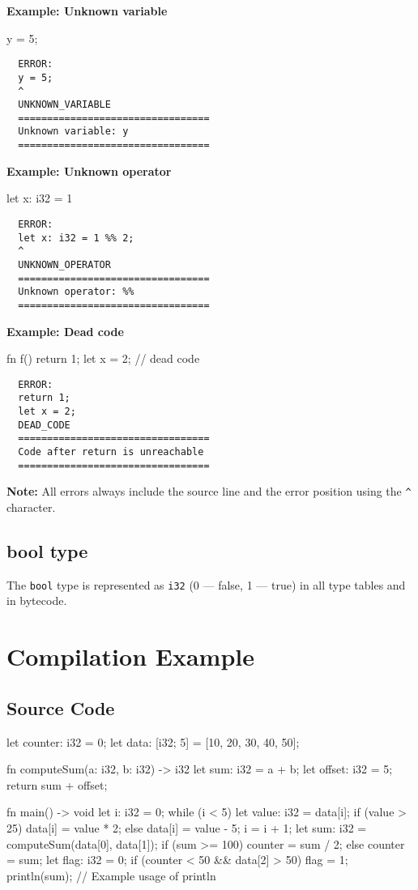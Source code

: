 \documentclass[a4paper,12pt]{article}
\begin{document}
    \textbf{Example: Unknown variable}
    \begin{snailcode}
        y = 5;
    \end{snailcode}
    \begin{verbatim}
  ERROR:
  y = 5;
  ^
  UNKNOWN_VARIABLE
  =================================
  Unknown variable: y
  =================================
    \end{verbatim}

    \textbf{Example: Unknown operator}
    \begin{snailcode}
        let x: i32 = 1 %
    \end{snailcode}
    \begin{verbatim}
  ERROR:
  let x: i32 = 1 %% 2;
  ^
  UNKNOWN_OPERATOR
  =================================
  Unknown operator: %%
  =================================
    \end{verbatim}

    \textbf{Example: Dead code}
    \begin{snailcode}
        fn f() {
  return 1;
  let x = 2; // dead code
  }
    \end{snailcode}
    \begin{verbatim}
  ERROR:
  return 1;
  let x = 2;
  DEAD_CODE
  =================================
  Code after return is unreachable
  =================================
    \end{verbatim}

    \textbf{Note:} All errors always include the source line and the error position using the \texttt{^} character.

    \subsection*{bool type}
    The \texttt{bool} type is represented as \texttt{i32} (0 --- false, 1 --- true) in all type tables and in bytecode.

    \section{Compilation Example}
    \subsection{Source Code}
    \begin{snailcode}
        let counter: i32 = 0;
  let data: [i32; 5] = [10, 20, 30, 40, 50];

  fn computeSum(a: i32, b: i32) -> i32 {
  let sum: i32 = a + b;
  let offset: i32 = 5;
  return sum + offset;
  }

  fn main() -> void {
  let i: i32 = 0;
  while (i < 5) {
  let value: i32 = data[i];
  if (value > 25) {
  data[i] = value * 2;
  } else {
  data[i] = value - 5;
  }
  i = i + 1;
  }
  let sum: i32 = computeSum(data[0], data[1]);
  if (sum >= 100) {
  counter = sum / 2;
  } else {
  counter = sum;
  }
  let flag: i32 = 0;
  if (counter < 50 && data[2] > 50) {
  flag = 1;
  }
  println(sum); // Example usage of println
  }
    \end{snailcode}
\end{document}
